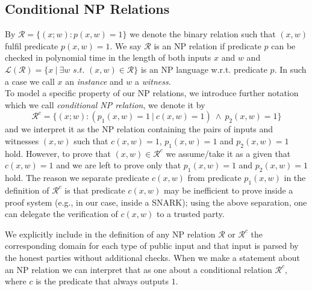 \subsection{Conditional NP Relations}
\label{sec:conditional_relations}
\noindent By $\mathcal{R} =\{(x;w): p(x,w) = 1 \}$ we denote the binary relation such that $(x,w)$ 
fulfil predicate $p(x,w) = 1$. We say $\mathcal{R}$ is an NP relation if predicate $p$ can be checked in polynomial 
time in the length of both inputs $x$ and $w$ and $\mathcal{L}(\mathcal{R})= \{x \ | \ \exists w \textit{ s.t. } (x,w) \in \mathcal{R} \}$ 
is an NP language w.r.t. predicate $p$. In such a case we call $x$ an \emph{instance} and $w$ a \emph{witness}.  \\

\noindent  To model a specific property of our NP relations, we introduce further notation which we call \emph{conditional NP relation}, we denote it by 
$$\mathcal{R}^c = \{(x;w) : (p_1(x,w) =1 \ | \ c(x,w) =1) \ \wedge \ p_2(x,w) = 1 \}$$ and we interpret it as the NP relation containing the pairs of inputs and witnesses 
$(x,w)$ such that $c(x,w) =1$, $p_1(x,w) = 1$ and $p_2(x,w) =1$ hold. However, to prove that $(x,w) \in \mathcal{R}^c$ we assume/take it as a given that 
$c(x,w) =1$ and we are left to prove only that $p_1(x,w) = 1$ and $p_2(x,w) =1$ hold. The reason we separate predicate $c(x,w)$ from predicate $p_1(x,w)$ in the definition 
of $\mathcal{R}^c$ is that predicate $c(x,w)$ may be inefficient to prove inside a proof system (e.g., in our case, inside a SNARK); using the above separation, one can delegate  the verification of $c(x,w)$ to a trusted party.%

\noindent We explicitly include in the definition of any NP relation $\mathcal{R}$ or $\mathcal{R}^c$ the corresponding domain for each type 
of public input and that input is parsed by the honest parties without additional checks. 
When we make a statement about an NP relation we can interpret that as one about a conditional relation $\mathcal{R}^c$, where $c$ is the predicate that always outputs $1$.
\vspace{-0.07in}


